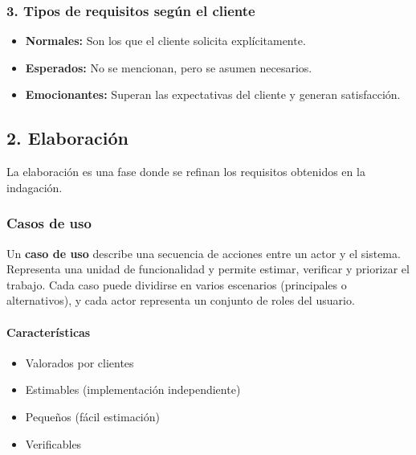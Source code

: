     \subsubsection*{3. Tipos de requisitos según el cliente}


    \begin{itemize}

        \item \textbf{Normales:} Son los que el cliente solicita explícitamente.

        \item \textbf{Esperados:} No se mencionan, pero se asumen necesarios.

        \item \textbf{Emocionantes:} Superan las expectativas del cliente y generan satisfacción.

    \end{itemize}

    \subsection*{2. Elaboración}\label{subsec:elaboracion}

    La elaboración es una fase donde se refinan los requisitos obtenidos en la indagación.

    \subsubsection*{Casos de uso}

    \begin{definicion}
        Un \textbf{caso de uso} describe una secuencia de acciones entre un actor y el sistema.
        Representa una unidad de funcionalidad y permite estimar, verificar y priorizar el trabajo.
        Cada caso puede dividirse en varios escenarios (principales o alternativos), y cada actor representa un conjunto de roles del usuario.
    \end{definicion}

    \paragraph{Características}

    \begin{itemize}

        \item Valorados por clientes

        \item Estimables (implementación independiente)

        \item Pequeños (fácil estimación)

        \item Verificables
    \end{itemize}



